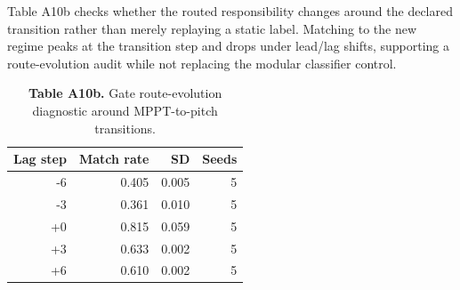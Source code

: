\documentclass[
  journal]{IEEEtran}
\begin{document}
Table A10b checks whether the routed responsibility changes around the
declared transition rather than merely replaying a static label.
Matching to the new regime peaks at the transition step and drops under
lead/lag shifts, supporting a route-evolution audit while not replacing
the modular classifier control.

\begin{table}[!t]
\centering
\fontsize{8.0pt}{9.6pt}\selectfont
\setlength{\tabcolsep}{4pt}
\renewcommand{\arraystretch}{1.05}
\caption*{\textbf{Table A10b.} Gate route-evolution diagnostic around MPPT-to-pitch transitions.}
\begin{tabular}{rrrr}
\toprule
Lag step & Match rate & SD & Seeds \\
\midrule
-6 & 0.405 & 0.005 & 5 \\
-3 & 0.361 & 0.010 & 5 \\
+0 & 0.815 & 0.059 & 5 \\
+3 & 0.633 & 0.002 & 5 \\
+6 & 0.610 & 0.002 & 5 \\
\bottomrule
\end{tabular}
\end{table}
\end{document}
